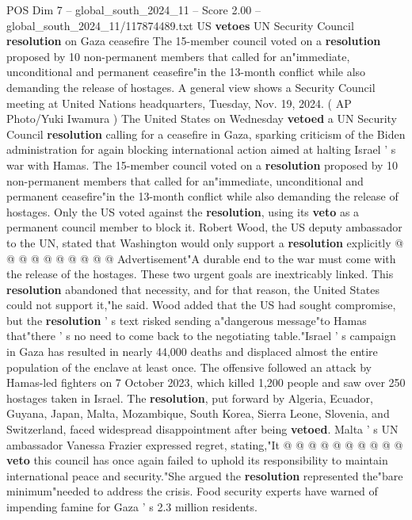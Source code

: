 \begin{textsample}{POS Dim 7 – global\_south\_2024\_11 – Score 2.00 – global\_south\_2024\_11/117874489.txt}  \label{ex:f7_pos_017}
US \textbf{vetoes} UN Security Council \textbf{resolution} on Gaza ceasefire The 15-member council voted on a \textbf{resolution} proposed by 10 non-permanent members that called for an"immediate, unconditional and permanent ceasefire"in the 13-month conflict while also demanding the release of hostages.
A general view shows a Security Council meeting at United Nations headquarters, Tuesday, Nov. 19, 2024. ( AP Photo/Yuki Iwamura ) The United States on Wednesday \textbf{vetoed} a UN Security Council \textbf{resolution} calling for a ceasefire in Gaza, sparking criticism of the Biden administration for again blocking international action aimed at halting Israel ' s war with Hamas.
The 15-member council voted on a \textbf{resolution} proposed by 10 non-permanent members that called for an"immediate, unconditional and permanent ceasefire"in the 13-month conflict while also demanding the release of hostages.
Only the US voted against the \textbf{resolution}, using its \textbf{veto} as a permanent council member to block it.
Robert Wood, the US deputy ambassador to the UN, stated that Washington would only support a \textbf{resolution} explicitly @ @ @ @ @ @ @ @ @ @ Advertisement"A durable end to the war must come with the release of the hostages.
These two urgent goals are inextricably linked.
This \textbf{resolution} abandoned that necessity, and for that reason, the United States could not support it,"he said.
Wood added that the US had sought compromise, but the \textbf{resolution} ' s text risked sending a"dangerous message"to Hamas that"there ' s no need to come back to the negotiating table."Israel ' s campaign in Gaza has resulted in nearly 44,000 deaths and displaced almost the entire population of the enclave at least once.
The offensive followed an attack by Hamas-led fighters on 7 October 2023, which killed 1,200 people and saw over 250 hostages taken in Israel.
The \textbf{resolution}, put forward by Algeria, Ecuador, Guyana, Japan, Malta, Mozambique, South Korea, Sierra Leone, Slovenia, and Switzerland, faced widespread disappointment after being \textbf{vetoed}.
Malta ' s UN ambassador Vanessa Frazier expressed regret, stating,"It @ @ @ @ @ @ @ @ @ @ \textbf{veto} this council has once again failed to uphold its responsibility to maintain international peace and security."She argued the \textbf{resolution} represented the"bare minimum"needed to address the crisis.
Food security experts have warned of impending famine for Gaza ' s 2.3 million residents.

\end{textsample}
